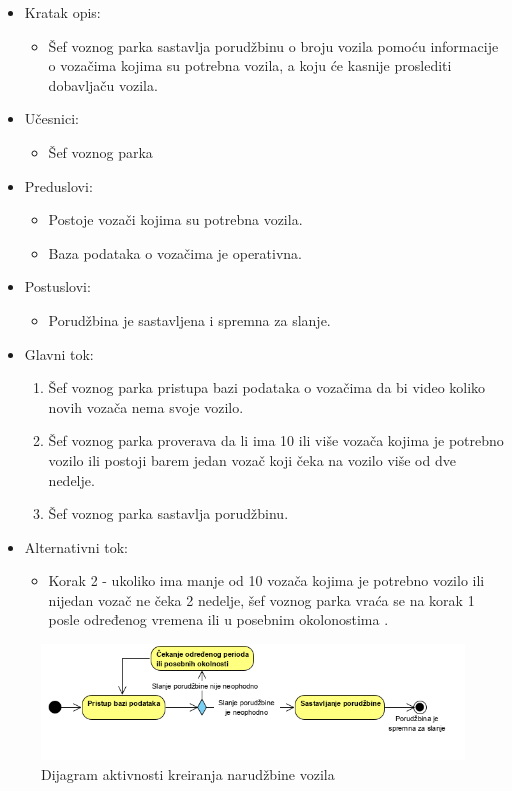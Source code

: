 \begin{itemize}
	\item Kratak opis:
		\begin{itemize}
			\item Šef voznog parka sastavlja porudžbinu o broju vozila pomoću informacije o vozačima kojima su potrebna vozila, a koju će kasnije proslediti dobavljaču vozila.
		\end{itemize}
	\item Učesnici:
		\begin{itemize}
		    \item Šef voznog parka
		\end{itemize}
	\item Preduslovi:
		\begin{itemize}
		    \item Postoje vozači kojima su potrebna vozila.
		    \item Baza podataka o vozačima je operativna.
		\end{itemize}
	\item Postuslovi:
		\begin{itemize}
			\item Porudžbina je sastavljena i spremna za slanje.
	\end{itemize}
	\item Glavni tok:
		\begin{enumerate}
		    \item Šef voznog parka pristupa bazi podataka o vozačima da bi video koliko novih vozača nema svoje vozilo.
		    \item Šef voznog parka proverava da li ima 10 ili više vozača kojima je potrebno vozilo ili postoji barem jedan vozač koji čeka na vozilo više od dve nedelje.
		    \item Šef voznog parka sastavlja porudžbinu.
		\end{enumerate}
	\item Alternativni tok:
		\begin{itemize}
		    \item Korak 2 - ukoliko ima manje od 10 vozača kojima je potrebno vozilo ili nijedan vozač ne čeka 2 nedelje, šef voznog parka vraća se na korak 1 posle određenog vremena ili u posebnim okolonostima .
		\end{itemize}
\end{itemize}

\begin{figure}[H]
\begin{center}
\includegraphics[width=\textwidth]{Slike/NarucivanjeVozila.png}
\end{center}
    \caption{Dijagram aktivnosti kreiranja narudžbine vozila}
\label{fig:NaručivanjeVozila}
\end{figure}

